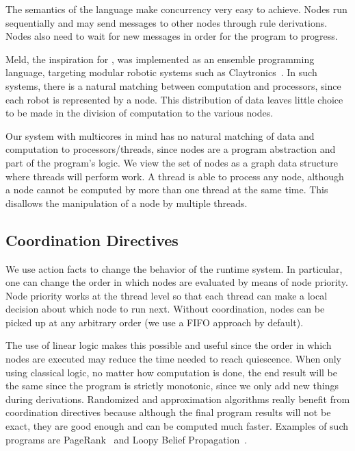 The semantics of the \lang language make concurrency very easy to achieve.
Nodes run sequentially and may send messages to other nodes through rule derivations. Nodes
also need to wait for new messages in order for the program to progress.

Meld, the inspiration for \lang, was
implemented as an ensemble programming language, targeting modular robotic systems such as
Claytronics~\cite{ashley-rollman-derosa-iros07wksp}. In such systems, there is a natural matching
between computation and processors, since each robot is represented by a node. This distribution
of data leaves little choice to be made in the division of computation to the various nodes.

Our \lang system with multicores in mind has no natural matching of data and computation to processors/threads,
since nodes are a program abstraction and part of the program's logic.
We view the set of nodes as a graph data structure where threads will perform work.
A thread is able to process any node, although a node cannot be computed by more than one thread
at the same time. This disallows the manipulation of a node by multiple threads.

\subsection{Coordination Directives}

We use action facts to change the behavior of the runtime system. In particular, one can change the
order in which nodes are evaluated by means of node priority. Node priority works at the thread level
so that each thread can make a local decision about which node to run next. Without coordination,
nodes can be picked up at any arbitrary order (we use a FIFO approach by default).

The use of linear logic makes this possible and useful since the order in which nodes are executed
may reduce the time needed to reach quiescence. When only using
classical logic, no matter how computation is done, the end result will be the same since the program
is strictly monotonic, since we only add new things during derivations. Randomized and approximation
algorithms really benefit from coordination directives because although the final program results
will not be exact, they are good enough and can be computed much faster.
Examples of such programs are PageRank~\cite{Lubachevsky:1986:CAA:4904.4801} and
Loopy Belief Propagation~\cite{Gonzalez+al:aistats09paraml}.

